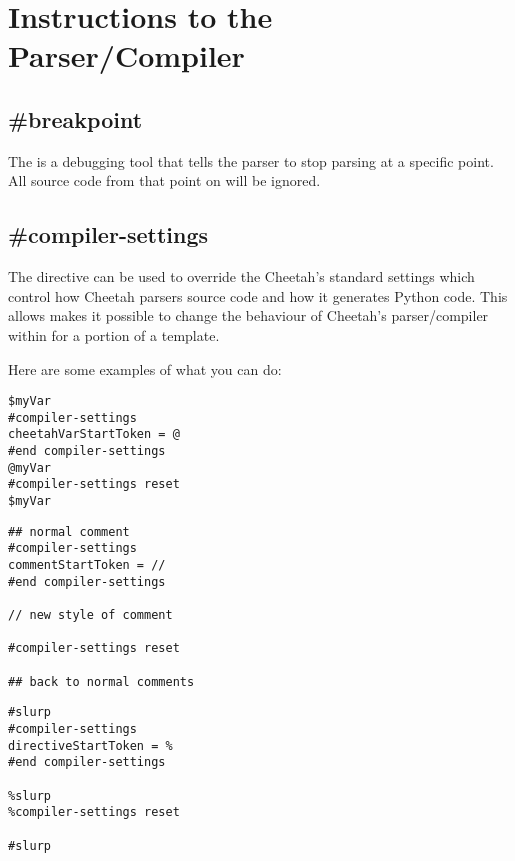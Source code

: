 \section{Instructions to the Parser/Compiler}
\label{parserInstructions}


\subsection{\#breakpoint}
\label{parserInstructions.breakpoint}

The  is a debugging tool that tells the parser to stop
parsing at a specific point. All source code from that point on will be ignored.


\subsection{\#compiler-settings}
\label{parserInstructions.settings}

The  directive can be used to override the Cheetah's
standard settings which control how Cheetah parsers source code and how it
generates Python code.  This allows makes it possible to change the behaviour of
Cheetah's parser/compiler within for a portion of a template.

Here are some examples of what you can do:
\begin{verbatim}
$myVar
#compiler-settings
cheetahVarStartToken = @
#end compiler-settings
@myVar
#compiler-settings reset
$myVar
\end{verbatim}


\begin{verbatim}
## normal comment
#compiler-settings
commentStartToken = //
#end compiler-settings

// new style of comment

#compiler-settings reset

## back to normal comments
\end{verbatim}

\begin{verbatim}
#slurp
#compiler-settings
directiveStartToken = %
#end compiler-settings

%slurp
%compiler-settings reset

#slurp
\end{verbatim}

